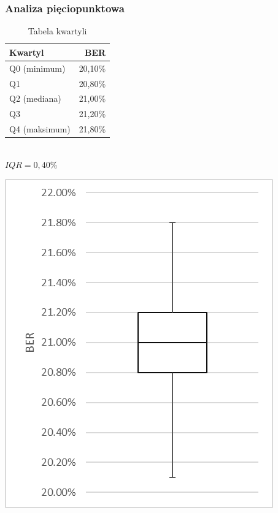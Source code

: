 \documentclass{article}
\begin{document}
		\subsubsection{Analiza pięciopunktowa}
			\begin{table}[h]
				\begin{minipage}{0.5\linewidth}
					\caption{Tabela kwartyli}
					\label{table:student}
					\centering
					\begin{tabular}{lr}
						\toprule
						Kwartyl						& BER \\
						\midrule
						Q0 (minimum)		& 20,10\% \\
						Q1    							& 20,80\% \\
						Q2 (mediana)  		& 21,00\% \\
						Q3   							& 21,20\% \\
						Q4 (maksimum)	& 21,80\% \\
						\bottomrule
					\end{tabular}\\\vspace{5mm}
					$IQR = 0,40\%$
				\end{minipage}
				\begin{minipage}{0.45\linewidth}
					\centering
					\includegraphics[width=0.8\linewidth]{img/five_qpsk07.png}
					\label{ }
				\end{minipage}
			\end{table}
			
\end{document}
